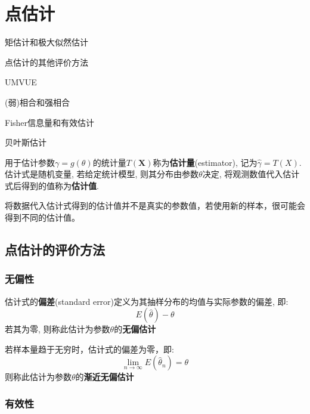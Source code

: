\chapter{点估计}

\begin{introduction}[考试重点]
    \item 矩估计和极大似然估计
    \item 点估计的其他评价方法
    \item UMVUE
    \item (弱)相合和强相合
    \item Fisher信息量和有效估计
    \item 贝叶斯估计
\end{introduction}

\begin{definition}[点估计]
    用于估计参数$\gamma = g(\theta)$的统计量$T(\mathbf{X})$称为\textbf{估计量}(estimator), 记为$\hat{\gamma} = T(X)$. 估计式是随机变量, 若给定统计模型, 则其分布由参数$\theta$决定, 将观测数值代入估计式后得到的值称为\textbf{估计值}.
\end{definition}

将数据代入估计式得到的估计值并不是真实的参数值，若使用新的样本，很可能会得到不同的估计值。

\section{点估计的评价方法}

\subsection{无偏性}

\begin{definition}[无偏估计]
    估计式的\textbf{偏差}(standard error)定义为其抽样分布的均值与实际参数的偏差, 即:
    \[ E(\hat{\theta})-\theta \]
    若其为零, 则称此估计为参数$\theta$的\textbf{无偏估计}
\end{definition}

\begin{definition}[渐进无偏估计]
    若样本量趋于无穷时，估计式的偏差为零，即:
    \[ \lim_{n \to \infty}E(\hat{\theta}_n)=\theta \]
    则称此估计为参数$\theta$的\textbf{渐近无偏估计}
\end{definition}

\subsection{有效性}

